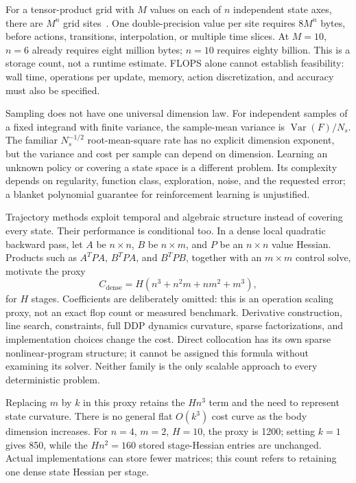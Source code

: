 For a tensor-product grid with $M$ values on each of $n$ independent state
axes, there are $M^n$ grid sites~\cite{Bellman1961}. One double-precision value
per site requires $8M^n$ bytes, before actions, transitions, interpolation,
or multiple time slices. At $M=10$, $n=6$ already requires eight million
bytes; $n=10$ requires eighty billion. This is a storage count, not a runtime
estimate. FLOPS alone cannot establish feasibility: wall time, operations per
update, memory, action discretization, and accuracy must also be specified.

Sampling does not have one universal dimension law. For independent samples
of a fixed integrand with finite variance, the sample-mean variance is
$\operatorname{Var}(F)/N_s$. The familiar $N_s^{-1/2}$ root-mean-square rate
has no explicit dimension exponent, but the variance and cost per sample can
depend on dimension. Learning an unknown policy or covering a state space is
a different problem. Its complexity depends on regularity, function class,
exploration, noise, and the requested error; a blanket polynomial guarantee
for reinforcement learning is unjustified.

Trajectory methods exploit temporal and algebraic structure instead of
covering every state. Their performance is conditional too. In a dense local
quadratic backward pass, let $A$ be $n\times n$, $B$ be $n\times m$, and $P$
be an $n\times n$ value Hessian. Products such as $A^TPA$, $B^TPA$, and
$B^TPB$, together with an $m\times m$ control solve, motivate the proxy
\begin{equation}
 C_{\mathrm{dense}}=H(n^3+n^2m+nm^2+m^3),
 \label{eq:ch2:dense-proxy}
\end{equation}
for $H$ stages. Coefficients are deliberately omitted: this is an operation
scaling proxy, not an exact flop count or measured benchmark. Derivative
construction, line search, constraints, full DDP dynamics curvature, sparse
factorizations, and implementation choices change the cost. Direct collocation
has its own sparse nonlinear-program structure; it cannot be assigned this
formula without examining its solver. Neither family is the only scalable
approach to every deterministic problem.

Replacing $m$ by $k$ in this proxy retains the $Hn^3$ term and the need to
represent state curvature. There is no general flat $O(k^3)$ cost curve as the
body dimension increases. For $n=4$, $m=2$, $H=10$, the proxy is 1200; setting
$k=1$ gives 850, while the $Hn^2=160$ stored stage-Hessian entries are unchanged.
Actual implementations can store fewer matrices; this count refers to retaining
one dense state Hessian per stage.

